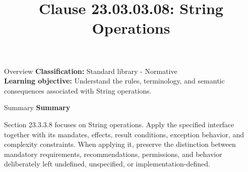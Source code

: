 \documentclass[10pt,letterpaper]{article}
\title{Clause 23.03.03.08: String Operations}
\author{}
\date{}
\begin{document}
\maketitle
\begin{CornellOverviewBox}{Overview}
\textbf{Classification:} Standard library - Normative\\[2pt]
\textbf{Learning objective:} Understand the rules, terminology, and semantic consequences associated with String operations.
\end{CornellOverviewBox}\begin{CornellSummaryBox}{Summary}
{\sffamily\bfseries\color{Accent} Summary}\par\vspace{3pt}Section 23.3.3.8 focuses on String operations. Apply the specified interface together with its mandates, effects, result conditions, exception behavior, and complexity constraints. When applying it, preserve the distinction between mandatory requirements, recommendations, permissions, and behavior deliberately left undefined, unspecified, or implementation-defined.
\end{CornellSummaryBox}
\end{document}
